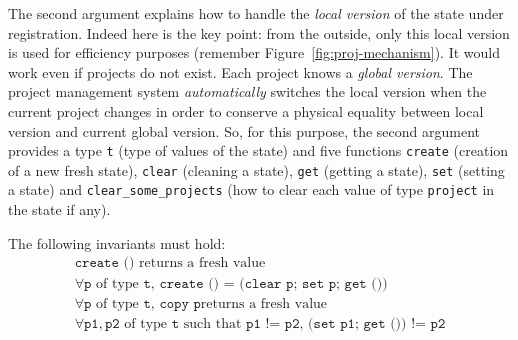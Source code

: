 The second argument explains how to handle the \emph{local
  version} of the state under
registration. Indeed here is the key point: from the outside, only this local
version is used for efficiency purposes (remember
Figure~\ref{fig:proj-mechanism}). It would work even if projects do not
exist. Each project knows a \emph{global version}. The project management system \emph{automatically}
switches the local version when the current
project changes in order to conserve a physical
equality between local version and current global
version. So, for this purpose, the second argument provides a type \texttt{t}
(type of values of the state) and five functions \texttt{create} (creation of a
new fresh state), \texttt{clear} (cleaning a state), \texttt{get} (getting a
state), \texttt{set} (setting a state) and \texttt{clear\_some\_projects} (how
to clear each value of type \texttt{project} in the state if any).

\begin{important}
The following invariants must
hold:\footnotemark
\begin{gather}
\texttt{create ()} \mbox{ returns a fresh value} \label{eq:create}\\
\forall \texttt{p} \mbox{ of type } \texttt{t},\,
\texttt{create () = (clear p; set p; get ())}\label{eq:clear}\\
\forall \texttt{p} \mbox{ of type } \texttt{t},\, \texttt{copy p} \mbox{
  returns a fresh value}
\label{eq:copy}\\
\forall \texttt{p1},\texttt{p2} \mbox{ of type } \texttt{t}
\mbox{ such that } \texttt{p1 != p2},\, \texttt{(set p1; get ()) != p2}
\label{eq:independance}
\end{gather}
\end{important}


